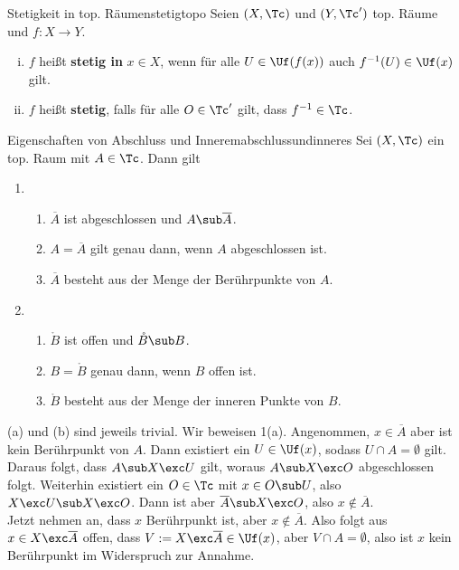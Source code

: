 \begin{definition}{Stetigkeit in top. Räumen}{stetigtopo}
Seien $(X, \Tc)$ und $(Y, \Tc')$ top. Räume und $f: X \to Y$.
\begin{enumerate}[(i)]
\item $f$ heißt \textbf{stetig in} $x \in X$, wenn für alle $U \in \Uf(f(x))$ auch $f^{-1}(U) \in \Uf(x)$ gilt.
\item $f$ heißt \textbf{stetig}, falls für alle $O \in \Tc'$ gilt, dass $f^{-1} \in \Tc$.
\end{enumerate}
\end{definition}
\begin{satz}{Eigenschaften von Abschluss und Innerem}{abschlussundinneres}
Sei $(X,\Tc)$ ein top. Raum mit $A \in \Tc$. Dann gilt
\begin{enumerate}
\item \begin{enumerate}
\item $\overline{A}$ ist abgeschlossen und $A \sub \overline{A}$.
\item $A = \overline{A}$ gilt genau dann, wenn $A$ abgeschlossen ist.
\item $\overline{A}$ besteht aus der Menge der Berührpunkte von $A$.
\end{enumerate}
\item \begin{enumerate}
\item $\mathring{B}$ ist offen und $\mathring{B} \sub B$.
\item $B = \mathring{B}$ genau dann, wenn $B$ offen ist.
\item $\mathring{B}$ besteht aus der Menge der inneren Punkte von $B$.
\end{enumerate}
\end{enumerate}
\end{satz}
\begin{beweis}
(a) und (b) sind jeweils trivial. Wir beweisen 1(a). Angenommen, $x \in \overline{A}$ aber ist kein Berührpunkt von $A$. Dann existiert ein $U \in \Uf(x)$, sodass $U \cap A = \emptyset$ gilt. Daraus folgt, dass $A \sub X \exc U$ gilt, woraus $A \sub X \exc O$ abgeschlossen folgt. Weiterhin existiert ein $O \in \Tc$ mit $x \in O \sub U$, also $X \exc U \sub X \exc O$. Dann ist aber $\overline{A} \sub X \exc O$, also $x \notin \overline{A}$.\\
Jetzt nehmen an, dass $x$ Berührpunkt ist, aber $x \notin  \overline{A}$. Also folgt aus $x \in X \exc \overline{A}$ offen, dass $V:= X \exc \overline{A} \in \Uf (x)$, aber $V \cap A = \emptyset$, also ist $x$ kein Berührpunkt im Widerspruch zur Annahme.
\end{beweis}
